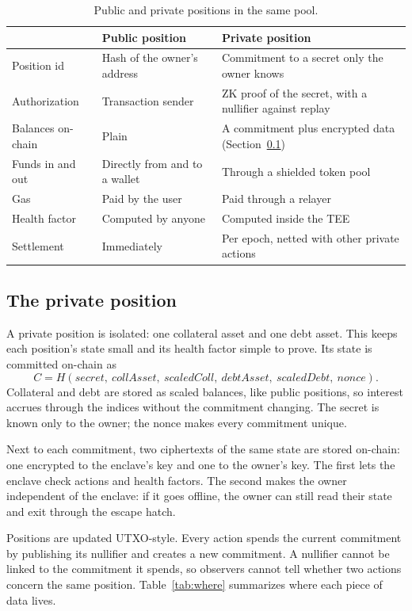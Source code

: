 \documentclass[11pt,a4paper]{article}
\begin{document}
\begin{table}[h]
\centering
\caption{Public and private positions in the same pool.}
\begin{tabularx}{\textwidth}{@{}p{3cm}LL@{}}
\toprule
 & Public position & Private position \\
\midrule
Position id & Hash of the owner's address & Commitment to a secret only the owner knows \\
Authorization & Transaction sender & ZK proof of the secret, with a nullifier against replay \\
Balances on-chain & Plain & A commitment plus encrypted data (Section~\ref{sec:privpos}) \\
Funds in and out & Directly from and to a wallet & Through a shielded token pool \\
Gas & Paid by the user & Paid through a relayer \\
Health factor & Computed by anyone & Computed inside the TEE \\
Settlement & Immediately & Per epoch, netted with other private actions \\
\bottomrule
\end{tabularx}
\end{table}

\subsection{The private position}
\label{sec:privpos}

A private position is isolated: one collateral asset and one debt asset. This keeps each position's state small
and its health factor simple to prove. Its state is committed on-chain as
\[
  C = H(\mathit{secret},\ \mathit{collAsset},\ \mathit{scaledColl},\ \mathit{debtAsset},\ \mathit{scaledDebt},\
  \mathit{nonce}).
\]
Collateral and debt are stored as scaled balances, like public positions, so interest accrues through the
indices without the commitment changing. The secret is known only to the owner; the nonce makes every commitment
unique.

Next to each commitment, two ciphertexts of the same state are stored on-chain: one encrypted to the enclave's
key and one to the owner's key. The first lets the enclave check actions and health factors. The second makes
the owner independent of the enclave: if it goes offline, the owner can still read their state and exit through
the escape hatch.

Positions are updated UTXO-style. Every action spends the current commitment by publishing its nullifier and
creates a new commitment. A nullifier cannot be linked to the commitment it spends, so observers cannot tell
whether two actions concern the same position. Table~\ref{tab:where} summarizes where each piece of data lives.
\end{document}
